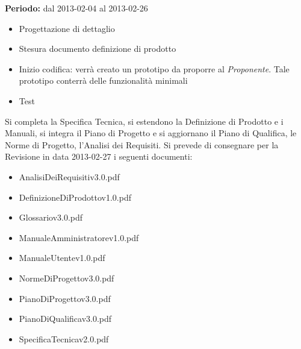{{	\textbf{Periodo:} dal 2013-02-04 al 2013-02-26\\
		\begin{itemize}
			\item Progettazione di dettaglio
			\item Stesura documento definizione di prodotto
			\item Inizio codifica: verrà creato un prototipo da proporre al \textit{Proponente}. Tale prototipo conterrà delle funzionalità minimali
			\item Test
		\end{itemize}
		 Si completa la Specifica Tecnica, si estendono la Definizione di Prodotto e i Manuali, si integra il Piano di Progetto e si aggiornano il Piano di Qualifica, le Norme di Progetto, l'Analisi dei Requisiti.
		 Si prevede di consegnare per la Revisione  in data 2013-02-27 i seguenti documenti:
		 \begin{itemize}
		 	\item AnalisiDeiRequisiti\textunderscore v3.0.pdf
		 	\item DefinizioneDiProdotto\textunderscore v1.0.pdf
		 	\item Glossario\textunderscore v3.0.pdf
		 	\item ManualeAmministratore\textunderscore v1.0.pdf
		 	\item ManualeUtente\textunderscore v1.0.pdf
		 	\item NormeDiProgetto\textunderscore v3.0.pdf
		 	\item PianoDiProgetto\textunderscore v3.0.pdf
		 	\item PianoDiQualifica\textunderscore v3.0.pdf
		 	\item SpecificaTecnica\textunderscore v2.0.pdf
		 \end{itemize}
		
	}
	\newpage
}
